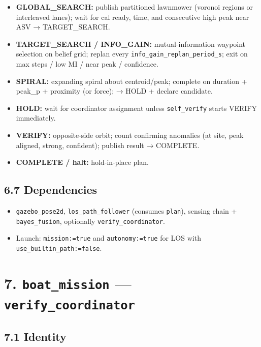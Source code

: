 \begin{itemize}[leftmargin=*]
\item \textbf{GLOBAL\_SEARCH:} publish partitioned lawnmower (voronoi regions or interleaved lanes); wait for cal ready, time, and consecutive high peak near ASV → TARGET\_SEARCH.
\item \textbf{TARGET\_SEARCH / INFO\_GAIN:} mutual-information waypoint selection on belief grid; replan every \texttt{info\_gain\_replan\_period\_s}; exit on max steps / low MI / near peak / confidence.
\item \textbf{SPIRAL:} expanding spiral about centroid/peak; complete on duration + peak\_p + proximity (or force); → HOLD + declare candidate.
\item \textbf{HOLD:} wait for coordinator assignment unless \texttt{self\_verify} starts VERIFY immediately.
\item \textbf{VERIFY:} opposite-side orbit; count confirming anomalies (at site, peak aligned, strong, confident); publish result → COMPLETE.
\item \textbf{COMPLETE / halt:} hold-in-place plan.
\end{itemize}


\subsection{6.7 Dependencies}


\begin{itemize}[leftmargin=*]
\item \texttt{gazebo\_pose2d}, \texttt{los\_path\_follower} (consumes \texttt{plan}), sensing chain + \texttt{bayes\_fusion}, optionally \texttt{verify\_coordinator}.
\item Launch: \texttt{mission:=true} and \texttt{autonomy:=true} for LOS with \texttt{use\_builtin\_path:=false}.
\end{itemize}




\section{7. \texttt{boat\_mission} --- \texttt{verify\_coordinator}}


\subsection{7.1 Identity}


